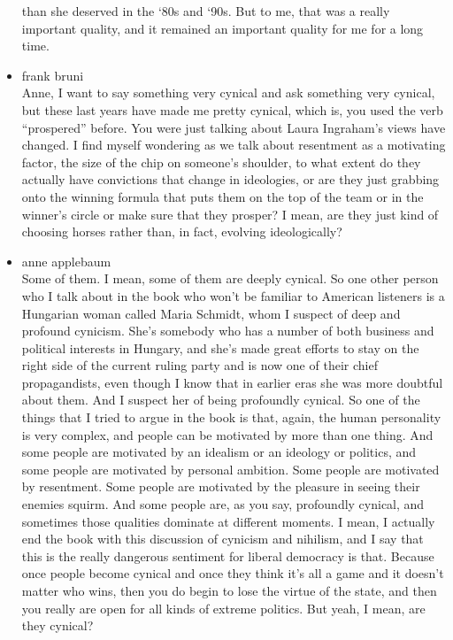 \begin{itemize}
  than she deserved in the `80s and `90s. But to me, that was a really
  important quality, and it remained an important quality for me for a
  long time.
\item
  frank bruni\\
  Anne, I want to say something very cynical and ask something very
  cynical, but these last years have made me pretty cynical, which is,
  you used the verb ``prospered'' before. You were just talking about
  Laura Ingraham's views have changed. I find myself wondering as we
  talk about resentment as a motivating factor, the size of the chip on
  someone's shoulder, to what extent do they actually have convictions
  that change in ideologies, or are they just grabbing onto the winning
  formula that puts them on the top of the team or in the winner's
  circle or make sure that they prosper? I mean, are they just kind of
  choosing horses rather than, in fact, evolving ideologically?
\item
  anne applebaum\\
  Some of them. I mean, some of them are deeply cynical. So one other
  person who I talk about in the book who won't be familiar to American
  listeners is a Hungarian woman called Maria Schmidt, whom I suspect of
  deep and profound cynicism. She's somebody who has a number of both
  business and political interests in Hungary, and she's made great
  efforts to stay on the right side of the current ruling party and is
  now one of their chief propagandists, even though I know that in
  earlier eras she was more doubtful about them. And I suspect her of
  being profoundly cynical. So one of the things that I tried to argue
  in the book is that, again, the human personality is very complex, and
  people can be motivated by more than one thing. And some people are
  motivated by an idealism or an ideology or politics, and some people
  are motivated by personal ambition. Some people are motivated by
  resentment. Some people are motivated by the pleasure in seeing their
  enemies squirm. And some people are, as you say, profoundly cynical,
  and sometimes those qualities dominate at different moments. I mean, I
  actually end the book with this discussion of cynicism and nihilism,
  and I say that this is the really dangerous sentiment for liberal
  democracy is that. Because once people become cynical and once they
  think it's all a game and it doesn't matter who wins, then you do
  begin to lose the virtue of the state, and then you really are open
  for all kinds of extreme politics. But yeah, I mean, are they cynical?

\end{itemize}
